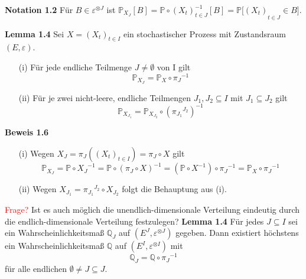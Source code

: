 \textbf{Notation 1.2}
Für $B \in \varepsilon^{ \otimes J}$ ist ${{\mathbb{P}}_{X_{J}}}[B] = {\mathbb{P} \circ {{(X_{t})}}_{t\in J}^{-1}[B] = \mathbb{P}[(X_{t})}_{t\in J} \in B]$. 

\clearpairofpagestyles
\ihead{\headmark}
\ohead{\pagemark}
\pagestyle{scrheadings}
\textbf{Lemma 1.4}
\label{Teilmengen Lemma}
Sei $X = {(X_{t})}_{t\in I}$ ein stochastischer Prozess mit Zustandsraum $(E,\varepsilon)$.
\begin{itemize}
\item[(i)] Für jede endliche Teilmenge $J \neq \emptyset$ von I gilt
\begin{equation*}
{{\mathbb{P}}_{X_{J}}} = {\mathbb{P}}_{X} \circ {\pi_{J}}^{-1}
\end{equation*}
\item[(ii)] Für je zwei nicht-leere, endliche Teilmengen $J_{1},J_{2} \subseteq I$ mit $J_{1} \subseteq J_{2}$ gilt
\begin{equation*}
{{\mathbb{P}}_{X_{J_{1}}}} = {\mathbb{P}}_{X_{J_{2}}} \circ {({\pi_{J_{1}}}^{J_{2}})}^{-1}
\end{equation*}
\end{itemize}

\textbf{Beweis 1.6}                                                                                                  
\mbox{}
\begin{itemize}
\item[(i)] Wegen $X_{J} = \pi_{J}({(X_{t})}_{t\in I}) = \pi_{J} \circ X$ gilt 
\begin{equation*}
{\mathbb{P}}_{X_{J}} = \mathbb{P} \circ {X_{J}}^{-1} = \mathbb{P} \circ {(\pi_{J} \circ X)}^{-1} = (\mathbb{P} \circ X^{-1}) \circ {\pi_{J}}^{-1} = \mathbb{P}_{X} \circ {\pi_{J}}^{-1} 
\end{equation*}

\item[(ii)] Wegen $X_{J_{1}} = {\pi_{J_{1}}}^{J_{2}} \circ X_{J_{2}}$ folgt die Behauptung aus (i).

\end{itemize}

\noindent
\textcolor{red}{Frage?} Ist es auch möglich die unendlich-dimensionale Verteilung eindeutig durch die endlich-dimensionale Verteilung festzulegen?
\textbf{Lemma 1.4}
Für jedes $J \subseteq I$ sei ein Wahrscheinlichkeitsmaß $\mathbb{Q}_{J}$ auf  $(E^{J},\varepsilon^{ \otimes J})$ gegeben. Dann existiert höchstens ein Wahrscheinlichkeitsmaß $\mathbb{Q}$ auf $(E^{I},\varepsilon^{ \otimes I})$ mit
\begin{equation*}
{\mathbb{Q}}_{J} = \mathbb{Q} \circ {\pi_{J}}^{-1} 
\end{equation*}
für alle endlichen $\emptyset \neq J \subseteq J$.

